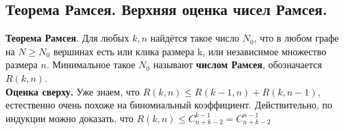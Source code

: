 \subsection{Теорема Рамсея. Верхняя оценка чисел Рамсея.}



\textbf{Теорема Рамсея}. Для любых $k, n$ найдётся такое число $N_0$, что в любом графе на $N \geq N_0$ вершинах есть или клика размера k, или независимое множество размера $n$. Минимальное такое $N_0$ называют \textbf{числом Рамсея}, обозначается $R(k, n)$. \\

\textbf{Оценка сверху.} Уже знаем, что $R(k, n) \leq R(k - 1, n) + R(k, n - 1)$, естественно очень похоже на биномиальный коэффициент. Действительно, по индукции можно доказать, что $R(k, n) \leq C^{k - 1}_{n + k - 2} = C^{n - 1}_{n + k - 2}$